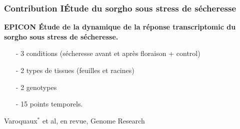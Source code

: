 \documentclass[11pt,xcolor=dvipsnames]{beamer}
\begin{document}
\begin{frame}
\frametitle{Contribution I\quad Étude du sorgho sous stress de sécheresse}
\vspace{2em}
\textbf{EPICON \quad Étude de la dynamique de la réponse transcriptomic du sorgho sous stress de
sécheresse.}
\vspace{2em}

\begin{itemize}
\small
\item[-] 3 conditions (sécheresse avant et après floraison + control)
\item[-] 2 types de tissues (feuilles et racines)
\item[-] 2 genotypes
\item[-] 15 points temporels.
\end{itemize}

\vspace{1em}
\begin{overlayarea}{12cm}{3cm}
{\centering
\begin{center}
\end{center}}
\end{overlayarea}
\begin{flushright}
{\tiny {\color{red} Varoquaux$^*$} et al, en revue, Genome Research}
\end{flushright}

\end{frame}
\end{document}
